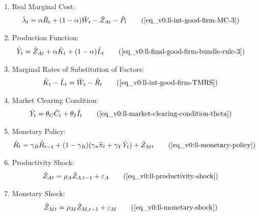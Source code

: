 \documentclass[
thesis.tex
]{subfiles}
\begin{document}
{\begin{itemize}
\begin{enumerate}
				\item Real Marginal Cost:
				\begin{align}
					\hat{\lambda}_t &= \alpha \hat{R}_t + (1- \alpha) \hat{W}_t - \hat{Z}_{At} - \hat{P}_t \tag{\ref{eq_v0:ll-int-good-firm-MC-3}}
				\end{align}
				
				\item Production Function:
				\begin{align}
					\hat{Y}_t &= \hat{Z}_{At} + \alpha \hat{K}_t + (1-\alpha) \hat{L}_t \tag{\ref{eq_v0:ll-final-good-firm-bundle-rule-3}}
				\end{align}
				
				
				\item Marginal Rates of Substitution of Factors:
				\begin{align}
					\hat{K}_t - \hat{L}_t &= \hat{W}_t - \hat{R}_t \tag{\ref{eq_v0:ll-int-good-firm-TMRS}}
				\end{align}
				
				\item Market Clearing Condition:
				\begin{align}
					\hat{Y}_t &= \theta_C \hat{C}_t + \theta_I \hat{I}_t 
					\tag{\ref{eq_v0:ll-market-clearing-condition-theta}}
				\end{align}
				
				\item Monetary Policy:
				\begin{align}
					& \hat{R}_t = \gamma_R \hat{R}_{t-1} + (1-\gamma_R)(\gamma_\pi \widetilde{\pi}_t + \gamma_Y \hat{Y}_t) + \hat{Z}_{Mt} \tag{\ref{eq_v0:ll-monetary-policy}}
				\end{align}
				
				\item Productivity Shock:
				\begin{align}
					\hat{Z}_{At} &= \rho_A \hat{Z}_{A,t-1} + \varepsilon_{A} \tag{\ref{eq_v0:ll-productivity-shock}}
				\end{align}
				
				\item Monetary Shock:
				\begin{align}
					\hat{Z}_{Mt} &= \rho_M \hat{Z}_{M,t-1} + \varepsilon_{M} \tag{\ref{eq_v0:ll-monetary-shock}}
				\end{align}
				
			\end{enumerate}
			
		\end{itemize}
		
	} %
\end{document}
